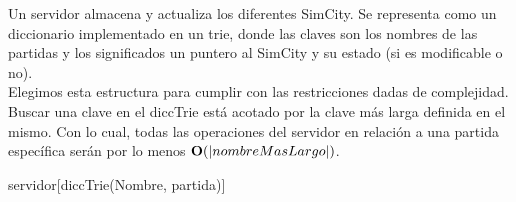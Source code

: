 \begin{Representacion}
  
  
    Un servidor almacena y actualiza los diferentes SimCity. Se representa como un 
    diccionario implementado en un trie, donde las claves son los nombres de las partidas
    y los significados un puntero al SimCity y su estado (si es modificable o no).\\

    Elegimos esta estructura para cumplir con las restricciones dadas de complejidad. Buscar una clave en el diccTrie está acotado
    por la clave más larga definida en el mismo. Con lo cual, todas las operaciones del servidor en relación a una partida específica
    serán por lo menos $\bold{O}(|nombreMasLargo|)$.
    

    \begin{Estructura}{servidor}[diccTrie(Nombre, partida)]
        \begin{Tupla}[partida]
        \end{Tupla}

    \end{Estructura}
    
    \vspace{2mm}
    \vspace{2mm}

    ~
    

\end{Representacion}
